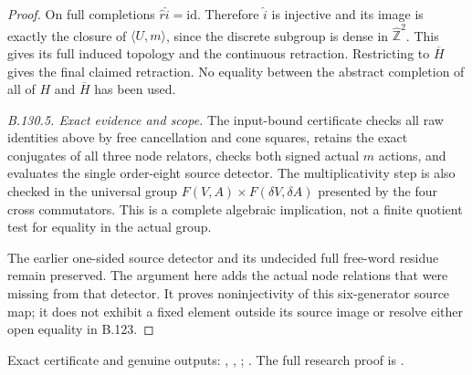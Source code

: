 \begin{proof}
On full completions $\widehat r\widehat i=\mathrm{id}$.
Therefore $\widehat i$ is injective and its image is exactly
the closure of $\langle U,m\rangle$, since the discrete subgroup
is dense in $\widehat{\mathbb Z}^2$. This gives its full
induced topology and the continuous retraction. Restricting to
$\overline H$ gives the final claimed retraction. No equality
between the abstract completion of all of $H$ and
$\overline H$ has been used.

\emph{B.130.5. Exact evidence and scope.}
The input-bound certificate checks all raw identities above by
free cancellation and cone squares, retains the exact conjugates
of all three node relators, checks both signed actual $m$ actions,
and evaluates the single order-eight source detector. The
multiplicativity step is also checked in the universal group
$F(V,A)\times F(\delta V,\delta A)$ presented by the four cross
commutators. This is a complete algebraic implication, not a
finite quotient test for equality in the actual group.

The earlier one-sided source detector and its undecided full
free-word residue remain preserved. The argument here adds the
actual node relations that were missing from that detector.
It proves noninjectivity of this six-generator source map;
it does not exhibit a fixed element outside its source image
or resolve either open equality in B.123.
\end{proof}

\begingroup\raggedright\footnotesize
Exact certificate and genuine outputs:
,
,
;
.
The full research proof is
.
\par\endgroup
